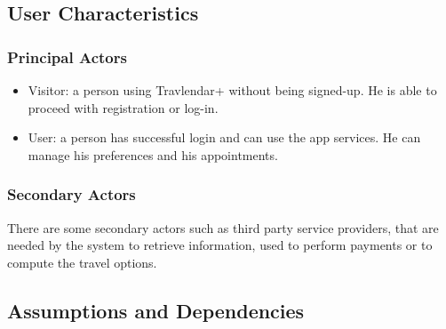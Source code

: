 \subsection{User Characteristics}

\subsubsection{Principal Actors}

\renewcommand{\labelitemi}{$-$}
\begin{itemize}
\item
Visitor: a person using Travlendar+ without being signed-up. He is able to proceed with registration or log-in.
\item
User: a person has successful login and can use the app services. He can manage his preferences and his appointments.
\end{itemize}

\subsubsection{Secondary Actors}
There are some secondary actors such as third party service providers, that are needed by the system to retrieve information, used to perform payments or to compute the travel options. 

\subsection{Assumptions and Dependencies}
